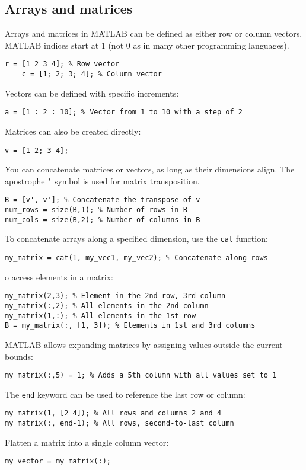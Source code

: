 \subsection{Arrays and matrices}
Arrays and matrices in MATLAB can be defined as either row or column vectors. 
MATLAB indices start at 1 (not 0 as in many other programming languages).
\begin{lstlisting}[style=MATLAB] 
    r = [1 2 3 4]; % Row vector 
    c = [1; 2; 3; 4]; % Column vector 
\end{lstlisting}
Vectors can be defined with specific increments:
\begin{lstlisting}[style=MATLAB] 
a = [1 : 2 : 10]; % Vector from 1 to 10 with a step of 2 
\end{lstlisting}
Matrices can also be created directly: 
\begin{lstlisting}[style=MATLAB] 
v = [1 2; 3 4]; 
\end{lstlisting}
You can concatenate matrices or vectors, as long as their dimensions align. 
The apostrophe \texttt{'} symbol is used for matrix transposition.
\begin{lstlisting}[style=MATLAB] 
B = [v', v']; % Concatenate the transpose of v 
num_rows = size(B,1); % Number of rows in B 
num_cols = size(B,2); % Number of columns in B 
\end{lstlisting}
To concatenate arrays along a specified dimension, use the \texttt{cat} function: 
\begin{lstlisting}[style=MATLAB] 
my_matrix = cat(1, my_vec1, my_vec2); % Concatenate along rows 
\end{lstlisting}
o access elements in a matrix: 
\begin{lstlisting}[style=MATLAB] 
my_matrix(2,3); % Element in the 2nd row, 3rd column 
my_matrix(:,2); % All elements in the 2nd column 
my_matrix(1,:); % All elements in the 1st row 
B = my_matrix(:, [1, 3]); % Elements in 1st and 3rd columns 
\end{lstlisting}
MATLAB allows expanding matrices by assigning values outside the current bounds: 
\begin{lstlisting}[style=MATLAB]
my_matrix(:,5) = 1; % Adds a 5th column with all values set to 1 
\end{lstlisting}
The \texttt{end} keyword can be used to reference the last row or column: 
\begin{lstlisting}[style=MATLAB] 
my_matrix(1, [2 4]); % All rows and columns 2 and 4 
my_matrix(:, end-1); % All rows, second-to-last column 
\end{lstlisting}
Flatten a matrix into a single column vector: 
\begin{lstlisting}[style=MATLAB]
my_vector = my_matrix(:); 
\end{lstlisting}

